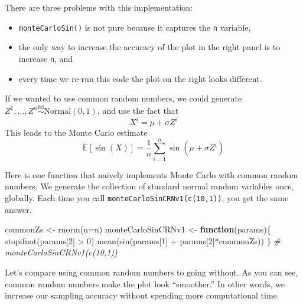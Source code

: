 \documentclass[
  12pt,
  krantz2]{krantz}
\makeatletter
\newenvironment{Shaded}{\begin{snugshade}}{\end{snugshade}}
\newcommand{\AttributeTok}[1]{\textcolor[rgb]{0.61,0.61,0.61}{#1}}
\newcommand{\CommentTok}[1]{\textcolor[rgb]{0.37,0.37,0.37}{\textit{#1}}}
\newcommand{\ControlFlowTok}[1]{\textcolor[rgb]{0.27,0.27,0.27}{\textbf{#1}}}
\newcommand{\DecValTok}[1]{\textcolor[rgb]{0.06,0.06,0.06}{#1}}
\newcommand{\FunctionTok}[1]{\textcolor[rgb]{0,0,0}{#1}}
\newcommand{\NormalTok}[1]{#1}
\newcommand{\OtherTok}[1]{\textcolor[rgb]{0.37,0.37,0.37}{#1}}
\newcommand{\SpecialCharTok}[1]{\textcolor[rgb]{0,0,0}{#1}}
\providecommand{\tightlist}{%
  \setlength{\itemsep}{0pt}\setlength{\parskip}{0pt}}
\newenvironment{kframe}{%
\medskip{}
\setlength{\fboxsep}{.8em}
 \def\at@end@of@kframe{}%
 \ifinner\ifhmode%
  \def\at@end@of@kframe{\end{minipage}}%
  \begin{minipage}{\columnwidth}%
 \fi\fi%
 \def\FrameCommand##1{\hskip\@totalleftmargin \hskip-\fboxsep
 \colorbox{shadecolor}{##1}\hskip-\fboxsep
     \hskip-\linewidth \hskip-\@totalleftmargin \hskip\columnwidth}%
 \MakeFramed {\advance\hsize-\width
   \@totalleftmargin\z@ \linewidth\hsize
   \@setminipage}}%
 {\par\unskip\endMakeFramed%
 \at@end@of@kframe}
\renewenvironment{Shaded}{\begin{kframe}}{\end{kframe}}
\makeatother
\begin{document}
There are three problems with this implementation:

\begin{itemize}
\tightlist
\item
  \texttt{monteCarloSin()} is not pure because it captures the \texttt{n} variable,
\item
  the only way to increase the accuracy of the plot in the right panel is to increase \texttt{n}, and
\item
  every time we re-run this code the plot on the right looks different.
\end{itemize}

If we wanted to use common random numbers, we could generate \(Z^1, \ldots, Z^n \overset{\text{iid}}{\sim} \text{Normal}(0, 1)\), and use the fact that
\[
X^i = \mu + \sigma Z^i
\]
This leads to the Monte Carlo estimate
\[
\tilde{\mathbb{E}}[\sin(X)] = \frac{1}{n}\sum_{i=1}^n\sin(\mu + \sigma Z^i)
\]

Here is one function that naively implements Monte Carlo with common random numbers. We generate the collection of standard normal random variables once, globally. Each time you call \texttt{monteCarloSinCRNv1(c(10,1))}, you get the same answer.

\begin{Shaded}
\begin{Highlighting}[]
\NormalTok{commonZs }\OtherTok{\textless{}{-}} \FunctionTok{rnorm}\NormalTok{(}\AttributeTok{n=}\NormalTok{n)}
\NormalTok{monteCarloSinCRNv1 }\OtherTok{\textless{}{-}} \ControlFlowTok{function}\NormalTok{(params)\{}
  \FunctionTok{stopifnot}\NormalTok{(params[}\DecValTok{2}\NormalTok{] }\SpecialCharTok{\textgreater{}} \DecValTok{0}\NormalTok{) }
  \FunctionTok{mean}\NormalTok{(}\FunctionTok{sin}\NormalTok{(params[}\DecValTok{1}\NormalTok{] }\SpecialCharTok{+}\NormalTok{ params[}\DecValTok{2}\NormalTok{]}\SpecialCharTok{*}\NormalTok{commonZs))}
\NormalTok{\} }
\CommentTok{\# monteCarloSinCRNv1(c(10,1))}
\end{Highlighting}
\end{Shaded}

Let's compare using common random numbers to going without. As you can see, common random numbers make the plot look ``smoother.'' In other words, we increase our sampling accuracy without spending more computational time.
\end{document}
